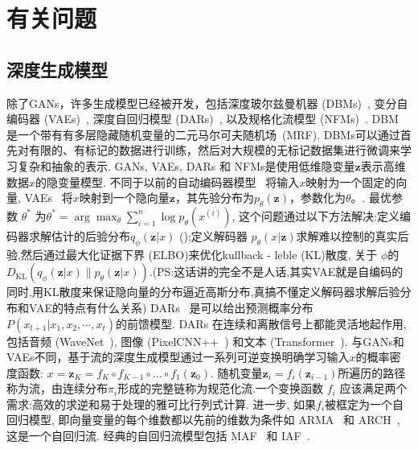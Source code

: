 \section{有关问题}
\label{sec:related}

\subsection{深度生成模型}
\label{sec:dgm}

除了GANs，许多生成模型已经被开发，包括深度玻尔兹曼机器 (DBMs)~\cite{salakhutdinov2009deep,salakhutdinov2010efficient,montavon2012deep,srivastava2012multimodal}, 变分自编码器 (VAEs)~\cite{kingma2013auto,higgins2017betavae}, 深度自回归模型 (DARs)~\cite{mathieu2015masked,vaswani2017attention,oord2016pixel,oord2016wavenet,salimans2017pixelcnn++}, 以及规格化流模型 (NFMs)~\cite{dinh2016density,dinh2014nice,kingma2018glow,lugmayr2020srflow}.
DBM 是一个带有有多层隐藏随机变量的二元马尔可夫随机场~(MRF). 
DBMs可以通过首先对有限的、有标记的数据进行训练，然后对大规模的无标记数据集进行微调来学习复杂和抽象的表示. 
GANs, VAEs, DARs 和 NFMs是使用低维隐变量$\mathbf{z}$表示高维数据$x$的隐变量模型. 
不同于以前的自动编码器模型~\cite{rifai2011contractive,vincent2008extracting} 将输入$x$映射为一个固定的向量, VAEs~\cite{kingma2013auto} 将$x$映射到一个隐向量$\mathbf{z}$，其先验分布为$p_\theta(\mathbf{z})$，参数化为$\theta$。. 
最优参数 $\theta^{*}$ 为$\theta^{*} = \arg\max_\theta \sum_{i=1}^n \log p_\theta(x^{(i)})$, 这个问题通过以下方法解决:定义编码器求解估计的后验分布$q_\phi (\mathbf{z}\vert x)$ ();定义解码器 $p_\theta(x\vert \mathbf{z})$求解难以控制的真实后验,然后通过最大化证据下界 (ELBO)来优化kullback - leble (KL)散度,  关于 $\phi$的$D_\text{KL}( q_\phi(\mathbf{z}\vert x) \| p_\theta(\mathbf{z}\vert x) )$.(PS:这话讲的完全不是人话,其实VAE就是自编码的同时,用KL散度来保证隐向量的分布逼近高斯分布,真搞不懂定义解码器求解后验分布和VAE的特点有什么关系)
DARs~\cite{mathieu2015masked,vaswani2017attention} 是可以给出预测概率分布$P(x_{t+1} | x_1, x_2, \cdots, x_t)$的前馈模型. DARs 在连续和离散信号上都能灵活地起作用, 包括音频 (WaveNet~\cite{oord2016wavenet}), 图像 (PixelCNN++~\cite{salimans2017pixelcnn++}) 和文本 (Transformer~\cite{vaswani2017attention}).
与GANs和VAEs不同，基于流的深度生成模型通过一系列可逆变换明确学习输入$x$的概率密度函数: $x = \mathbf{z}_K = f_K \circ f_{K-1} \circ \dots \circ f_1 (\mathbf{z}_0)$.
随机变量$\mathbf{z}_i = f_i(\mathbf{z}_{i-1})$所遍历的路径称为流，由连续分布$\pi_i$形成的完整链称为规范化流.一个变换函数 $f_i$ 应该满足两个需求:高效的求逆和易于处理的雅可比行列式计算.
进一步, 如果$f_i$被框定为一个自回归模型, 即向量变量的每个维数都以先前的维数为条件如 ARMA~\cite{box2011time} 和 ARCH~\cite{engle1982autoregressive}, 这是一个自回归流. 经典的自回归流模型包括 MAF~\cite{papamakarios2017masked} 和 IAF~\cite{kingma2016improved}.

